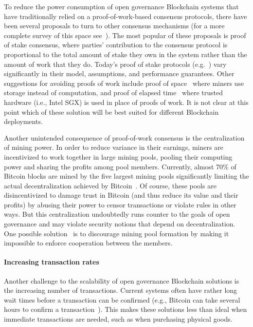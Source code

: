 To reduce the power consumption of open governance Blockchain systems that have traditionally relied on a proof-of-work-based consensus protocols, there have been several proposals to turn to other consensus mechanisms (for a more complete survey of this space see~\cite{Bano17}). The most popular of these proposals is proof of stake consensus, where parties' contribution to the consensus protocol is proportional to the total amount of stake they own in the system rather than the amount of work that they do. Today's proof of stake protocols (e.g.~\cite{FC:BenGabMiz16,eprint:BenPasShi16,CRYPTO:KRDO17,SOSP:GHMVZ17}) vary significantly in their model, assumptions, and performance guarantees.  Other suggestions for avoiding proofs of work include proof of space~\cite{CRYPTO:DFKP15, eprint:PPKAFG15} where miners use storage instead of computation, and proof of elapsed time~\cite{SSS:CXSGLS17} where trusted hardware (i.e., Intel SGX) is used in place of proofs of work.  It is not clear at this point which of these solution will be best suited for different Blockchain deployments.  

Another unintended consequence of proof-of-work consensus is the centralization of mining power.  In order to reduce variance in their earnings, miners are incentivized to work together in large mining pools, pooling their computing power and sharing the profits among pool members.  Currently, almost 70\% of Bitcoin blocks are mined by the five largest mining pools \cite{BlockchainInfoPools} significantly limiting the actual decentralization achieved by Bitcoin~\cite{arxiv:GBERS18}. Of course, these pools are disincentivized to damage trust in Bitcoin (and thus reduce its value and their profits) by abusing their power to censor transactions or violate rules in other ways. But this centralization undoubtedly runs counter to the goals of open governance and may violate security notions that depend on decentralization.  One possible solution~\cite{CCS:MKKS15} is to discourage mining pool formation by making it impossible to enforce cooperation between the members.

\paragraph{Increasing transaction rates}
Another challenge to the scalability of open governance Blockchain solutions is the increasing number of transactions.
Current systems often have rather long wait times before a transaction can be confirmed  (e.g., Bitcoin can take several hours to confirm a transaction~\cite{BlockchainInfoTransactionConfTime}).  This makes these solutions less than ideal when immediate transactions are needed, such as when purchasing physical goods.


